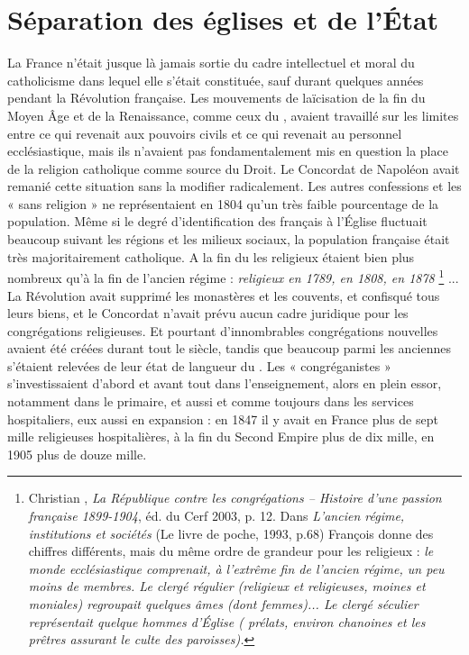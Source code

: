 

\chapter{Séparation des églises et de l'État}


 La France n'était jusque là jamais sortie du cadre intellectuel et moral du catholicisme dans lequel elle s'était constituée, sauf durant quelques années pendant la Révolution française. Les mouvements de laïcisation de la fin du Moyen Âge et de la Renaissance, comme ceux du , avaient travaillé sur les limites entre ce qui revenait aux pouvoirs civils et ce qui revenait au personnel ecclésiastique, mais ils n'avaient pas fondamentalement mis en question la place de la religion catholique comme source du Droit. Le Concordat de \hbox{Napoléon} avait remanié cette situation sans la modifier radicalement. Les autres confessions et les « sans religion » ne représentaient en 1804 qu'un très faible pourcentage de la population. Même si le degré d'identification des français à l'Église fluctuait beaucoup suivant les régions et les milieux sociaux, la population française était très majoritairement catholique. A la fin du  les religieux étaient bien plus nombreux qu'à la fin de l'ancien régime : {\emph{ religieux en 1789,  en 1808,  en 1878}%
\footnote{Christian , \emph{La République contre les congrégations – Histoire d'une passion française 1899-1904}, éd. du Cerf 2003, p. 12. Dans \emph{L'ancien régime, institutions et sociétés} (Le livre de poche, 1993, p.68) François  donne des chiffres différents, mais du même ordre de grandeur pour les religieux : \emph{le monde ecclésiastique comprenait, à l'extrême fin de l'ancien régime, un peu moins de  membres. Le clergé régulier (religieux et religieuses, moines et moniales) regroupait quelques  âmes (dont  femmes)... Le clergé séculier représentait quelque  hommes d'Église ( prélats, environ  chanoines et les  prêtres assurant le culte des  paroisses).}}%
}... La Révolution avait supprimé les monastères et les couvents, et confisqué tous leurs biens, et le Concordat n'avait prévu aucun cadre juridique pour les congrégations religieuses. Et pourtant d'innombrables congrégations nouvelles avaient été créées durant tout le siècle, tandis que beaucoup parmi les anciennes s'étaient relevées de leur état de langueur du . Les « congréganistes » s'investissaient d'abord et avant tout dans l'enseignement, alors en plein essor, notamment dans le primaire, et aussi et comme toujours dans les services hospitaliers, eux aussi en expansion : en 1847 il y avait en France plus de sept mille religieuses hospitalières, à la fin du Second Empire plus de dix mille, en 1905 plus de douze mille.

